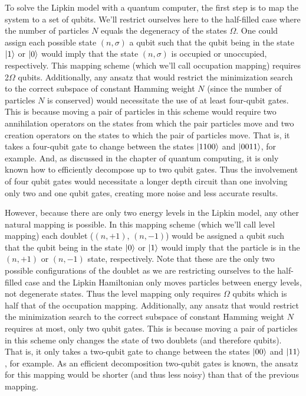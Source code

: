 \documentclass[Dual]{msu-thesis}
\begin{document}
To solve the Lipkin model with a quantum computer, the first step is to map the system to a set of qubits. We'll restrict ourselves here to the half-filled case where the number of particles $N$ equals the degeneracy of the states $\Omega$. One could assign each possible state $(n,\sigma)$ a qubit such that the qubit being in the state $\ket{1}$ or $\ket{0}$ would imply that the state $(n,\sigma)$ is occupied or unoccupied, respectively. This mapping scheme (which we'll call occupation mapping) requires 2$\Omega$ qubits. Additionally, any ansatz that would restrict the minimization search to the correct subspace of constant Hamming weight $N$ (since the number of particles $N$ is conserved) would necessitate the use of at least four-qubit gates. This is because moving a pair of particles in this scheme would require two annihilation operators on the states from which the pair particles move and two creation operators on the states to which the pair of particles move. That is, it takes a four-qubit gate to change between the states $\ket{1100}$ and $\ket{0011}$, for example. And, as discussed in the chapter of quantum computing, it is only known how to efficiently decompose up to two qubit gates. Thus the involvement of four qubit gates would necessitate a longer depth circuit than one involving only two and one qubit gates, creating more noise and less accurate results.

However, because there are only two energy levels in the Lipkin model, any other natural mapping is possible. In this mapping scheme (which we'll call level mapping) each doublet ($(n,+1)$, $(n,-1)$) would be assigned a qubit such that the qubit being in the state $\ket{0}$ or $\ket{1}$ would imply that the particle is in the $(n,+1)$ or $(n,-1)$ state, respectively. Note that these are the only two possible configurations of the doublet as we are restricting ourselves to the half-filled case and the Lipkin Hamiltonian only moves particles between energy levels, not degenerate states. Thus the level mapping only requires $\Omega$ qubits which is half that of the occupation mapping. Additionally, any ansatz that would restrict the minimization search to the correct subspace of constant Hamming weight $N$ requires at most, only two qubit gates. This is because moving a pair of particles in this scheme only changes the state of two doublets (and therefore qubits). That is, it only takes a two-qubit gate to change between the states $\ket{00}$ and $\ket{11}$, for example. As an efficient decomposition two-qubit gates is known, the ansatz for this mapping would be shorter (and thus less noisy) than that of the previous mapping.
\end{document}
